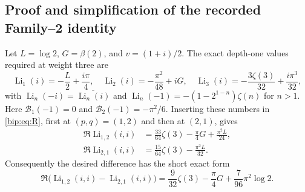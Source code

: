 \documentclass[11pt,a4paper]{article}
\numberwithin{equation}{section}
\theoremstyle{definition}
\theoremstyle{remark}
\DeclareMathOperator{\Li}{Li}
\begin{document}
\subsection{Proof and simplification of the recorded Family--2 identity}
Let $L=\log2$, $G=\beta(2)$, and $v=(1+i)/2$. The exact depth-one
values required at weight three are
\[
 \Li_1(i)=-\frac L2+\frac{i\pi}4,\quad
 \Li_2(i)=-\frac{\pi^2}{48}+iG,\quad
 \Li_3(i)=-\frac{3\zeta(3)}{32}+\frac{i\pi^3}{32},
\]
with $\Li_n(-i)=\overline{\Li_n(i)}$ and
$\Li_n(-1)=-(1-2^{1-n})\zeta(n)$ for $n>1$.
Here $\mathcal B_1(-1)=0$ and
$\mathcal B_2(-1)=-\pi^2/6$. Inserting these numbers in
\eqref{bip:eq:R}, first at $(p,q)=(1,2)$ and then at $(2,1)$,
gives
\begin{align}
 \Re\Li_{1,2}(i,i)
   &=\frac{33}{64}\zeta(3)-\frac\pi4G+\frac{\pi^2L}{24},
       \label{bip:eq:12}\\
 \Re\Li_{2,1}(i,i)
   &=\frac{15}{64}\zeta(3)-\frac{\pi^2L}{32}.
       \label{bip:eq:21}
\end{align}
Consequently the desired difference has the short exact form
\begin{equation}
 \boxed{\quad
 \Re\bigl(\Li_{1,2}(i,i)-\Li_{2,1}(i,i)\bigr)
 =\frac9{32}\zeta(3)-\frac\pi4G+\frac7{96}\pi^2\log2.
 \quad}
 \label{bip:eq:family2-short}
\end{equation}
\end{document}
